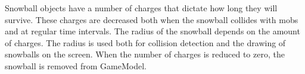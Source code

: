 Snowball objects have a number of charges that dictate how long they will survive. These charges are decreased both when the snowball collides with mobs and at regular time intervals. The radius of the snowball depends on the amount of charges. The radius is used both for collision detection and the drawing of snowballs on the screen. When the number of charges is reduced to zero, the snowball is removed from GameModel.